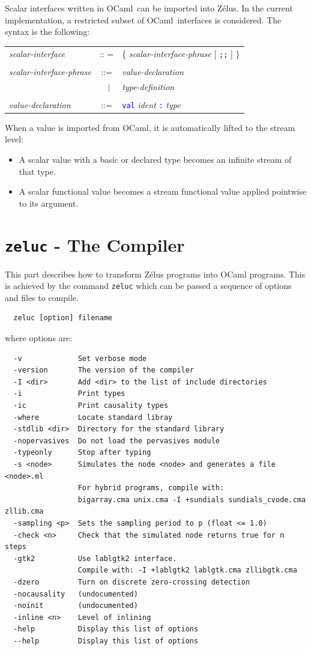 \documentclass[11pt,titlepage,twoside]{report}
\newcommand{\zelus}{{\sf Z\'elus}}
\newcommand{\ocaml}{{\sf OCaml}}
\newcommand{\alt}{\;|\;}
\newcommand{\Semisemi}{\mbox{{\tt ;;}}}
\newcommand{\term}[1]{\textcolor{Blue}{\tt #1}}
\newcommand{\nterm}[1]{\textcolor{BrickRed}{\it #1}}
\newcommand{\term}[1]{{\tt #1}}
\newcommand{\nterm}[1]{{\em #1}}
\begin{document}
Scalar interfaces written in \ocaml\ can be imported into \zelus.
In the current implementation, a restricted subset of \ocaml\ interfaces is
considered. The syntax is the following:
\begin{center}
\begin{tabular}{lcl}
\nterm{scalar-interface}
  & :: =   & \{ \nterm{scalar-interface-phrase} [ \term{\Semisemi} ] \} 
\\ \\
\nterm{scalar-interface-phrase}
  & ::=        & \nterm{value-declaration} \\
  & $\;\;\alt$ & \nterm{type-definition}
\\ \\
\nterm{value-declaration}
  & ::=        & \term{val} \nterm{ident} \term{:} \nterm{type}
\end{tabular}
\end{center}
When a value is imported from \ocaml, it
is automatically lifted to the stream level:
\begin{itemize}
\item
A scalar value with a basic or declared type becomes an infinite stream of 
that type.

\item
A scalar functional value becomes a stream functional value
applied pointwise to its argument.
\end{itemize}

\chapter{{\tt zeluc} - The Compiler\label{zeluc}} %
This part describes how to transform \zelus{} programs into \ocaml{}
programs. This is achieved by the command {\tt zeluc} which can be passed
a sequence of options and files to compile.

\begin{verbatim}
  zeluc [option] filename
\end{verbatim}
where options are:
\begin{verbatim}
  -v             Set verbose mode
  -version       The version of the compiler
  -I <dir>       Add <dir> to the list of include directories
  -i             Print types
  -ic            Print causality types
  -where         Locate standard libray
  -stdlib <dir>  Directory for the standard library
  -nopervasives  Do not load the pervasives module
  -typeonly      Stop after typing
  -s <node>      Simulates the node <node> and generates a file <node>.ml 
                 For hybrid programs, compile with:
                 bigarray.cma unix.cma -I +sundials sundials_cvode.cma zllib.cma
  -sampling <p>  Sets the sampling period to p (float <= 1.0)
  -check <n>     Check that the simulated node returns true for n steps
  -gtk2          Use lablgtk2 interface.
                 Compile with: -I +lablgtk2 lablgtk.cma zllibgtk.cma
  -dzero         Turn on discrete zero-crossing detection
  -nocausality   (undocumented)
  -noinit        (undocumented)
  -inline <n>    Level of inlining
  -help          Display this list of options
  --help         Display this list of options
\end{verbatim}
\end{document}

